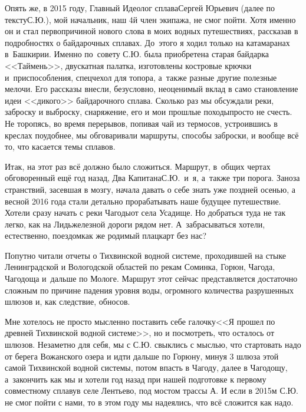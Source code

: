 Опять же, в 2015 году, Главный Идеолог сплава\mdash Сергей Юрьевич (далее по тексту\mdash С.Ю.), мой начальник, наш 4\sdash й член экипажа, не смог пойти. Хотя именно он и стал первопричиной нового слова в моих водных путешествиях, рассказав в подробностях о байдарочных сплавах. До~этого я ходил только на катамаранах в~Башкирии. Именно по~совету С.Ю. была приобретена старая байдарка <<Таймень>>, двускатная палатка, изготовлены костровые крючки и~приспособления, спецчехол для топора, а~также разные другие полезные мелочи. Его рассказы внесли, безусловно, неоценимый вклад в само становление идеи <<дикого>> байдарочного сплава. Сколько раз мы обсуждали реки, заброску и выброску, снаряжение, его и мои прошлые походы\mdash просто не счесть. Не торопясь, во время перерывов, попивая чай из термосов, устроившись в креслах поудобнее, мы обговаривали маршруты, способы заброски, и вообще всё то, что касается темы сплавов.

Итак, на этот раз всё должно было сложиться. Маршрут, в~общих чертах обговоренный ещё год назад, Два Капитана\mdash С.Ю.~и~я, а~также три порога. Заноза странствий, засевшая в мозгу, начала давать о себе знать уже поздней осенью, а весной 2016 года стали детально прорабатывать наше будущее путешествие. Хотели сразу начать с реки Чагоды\mdash от села Усадище. Но добраться туда не так легко, как на Лидь\mdash железной дороги рядом нет. А~забрасываться хотели, естественно, поездом\mdash как же родимый плацкарт без нас? 

Попутно читали отчеты о Тихвинской водной системе, проходившей на стыке Ленинградской и Вологодской областей по рекам Соминка, Горюн, Чагода, Чагодоща и~дальше по Мологе. Маршрут этот сейчас представляется достаточно сложным по причине падения уровня воды, огромного количества разрушенных шлюзов и, как следствие, обносов. 

Мне хотелось не просто мысленно поставить себе галочку\mdash <<Я прошел по древней Тихвинской водной системе>>, но и посмотреть, что осталось от шлюзов. Незаметно для себя, мы с С.Ю. свыклись с мыслью, что стартовать надо от берега Вожанского озера и идти дальше по Горюну, минуя 3 шлюза этой самой Тихвинской водной системы, потом впасть в Чагоду, далее в Чагодощу, а~закончить как мы и хотели год назад при нашей подготовке к первому совместному сплаву\mdash в селе Лентьево, под мостом трассы А. И если в 2015\sdash м С.Ю. не смог пойти с нами, то в этом году мы надеялись, что всё сложится как надо.

